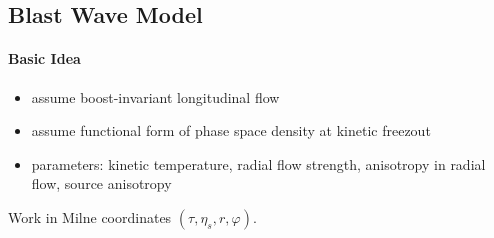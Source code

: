 \subsection{Blast Wave Model}

\paragraph*{Basic Idea \cite{JaiswalKoch_2015}}\mbox{}
\begin{itemize}
    \item assume boost-invariant longitudinal flow
    \item assume functional form of phase space density at kinetic freezout \done{}
    \item parameters: kinetic temperature, radial flow strength, anisotropy in radial flow, source anisotropy
\end{itemize}

Work in Milne coordinates $(\tau,\eta_s,r,\varphi)$.

